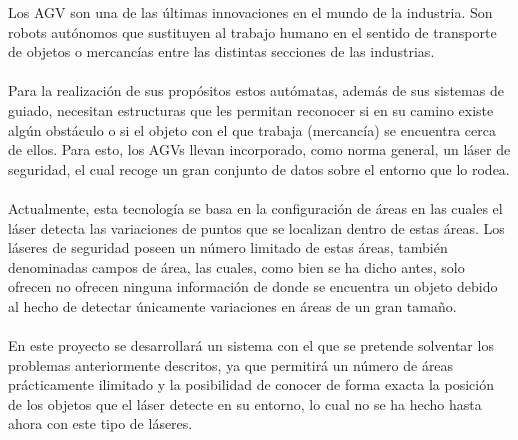 
Los AGV \cite{AGVdes} son una de las últimas innovaciones en el mundo de la industria. Son robots autónomos que sustituyen al trabajo humano en el sentido de transporte de objetos o mercancías entre las distintas secciones de las industrias. \\
\\
Para la realización de sus propósitos estos autómatas, además de sus sistemas de guiado, necesitan estructuras que les permitan reconocer si en su camino existe algún obstáculo o si el objeto con el que trabaja (mercancía) se encuentra cerca de ellos. Para esto, los AGVs llevan incorporado, como norma general, un láser de seguridad, el cual recoge un gran conjunto de datos sobre el entorno que lo rodea.\\
\\
Actualmente, esta tecnología se basa en la configuración de áreas en las cuales el láser detecta las variaciones de puntos que se localizan dentro de estas áreas. Los láseres de seguridad poseen un número limitado de estas áreas, también denominadas campos de área, las cuales, como bien se ha dicho antes, solo ofrecen no ofrecen ninguna información de donde se encuentra un objeto debido al hecho de detectar únicamente variaciones en áreas de un gran tamaño.\\
\\
En este proyecto se desarrollará un sistema con el que se pretende solventar los problemas anteriormente descritos, ya que permitirá un número de áreas prácticamente ilimitado y la posibilidad de conocer de forma exacta la posición de los objetos que el láser detecte en su entorno, lo cual no se ha hecho hasta ahora con este tipo de láseres.\\
\\

